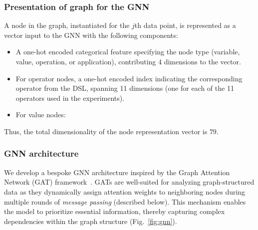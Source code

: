 \subsubsection{Presentation of graph for the GNN}
A node in the graph, instantiated for the $j$th data point, is represented as a vector input to the GNN with the following components:
\begin{itemize}
    \item A one-hot encoded categorical feature specifying the node type (variable, value, operation, or application), contributing 4 dimensions to the vector.
    \item For operator nodes, a one-hot encoded index indicating the corresponding operator from the DSL, spanning 11 dimensions (one for each of the 11 operators used in the experiments).
    \item For value nodes:
\end{itemize}
Thus, the total dimensionality of the node representation vector is $79$.







\subsubsection{GNN architecture}\label{sec:gnn-arch}

We develop a bespoke GNN architecture inspired by the Graph Attention Network (GAT) framework~\cite{velivckovic2018graph}. GATs are well-suited for analyzing graph-structured data as they dynamically assign attention weights to neighboring nodes during multiple rounds of \emph{message passing} (described below). This mechanism enables the model to prioritize essential information, thereby capturing complex dependencies within the graph structure (Fig.\ \ref{fig:gnn}).

